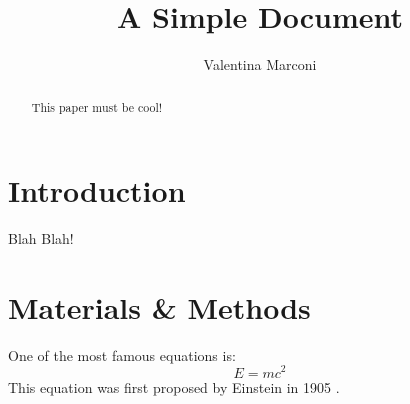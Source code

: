 \documentclass[12pt]{article}
\title{A Simple Document}
\author{Valentina Marconi}
\date{}
\begin{document}
\maketitle
\begin{abstract}
This paper must be cool!
\end{abstract}
\section{Introduction}
Blah Blah!
\section{Materials \& Methods}
One of the most famous equations is:
\begin{equation}
E = mc^2
\end{equation}
This equation was first proposed by Einstein in 1905
\cite{einstein1905does}.


\end{document}
